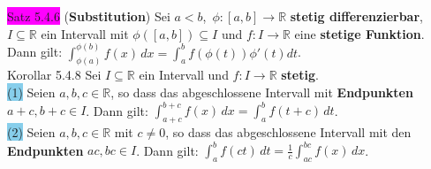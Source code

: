 \documentclass[landscape, 10pt]{article}
\newcommand{\R}{\mathbb{R}}
\begin{document}
\begin{multicols}{3}
              \colorbox{magenta}{Satz 5.4.6} 
              (\textbf{Substitution}) 
                     Sei \textcolor{NavyBlue}{$a<b$},\,
                     \textcolor{NavyBlue}{$\phi:[a,b]\longrightarrow\R$}
                     \textbf{stetig differenzierbar}, 
                     \textcolor{NavyBlue}{$I\subseteq\R$}
                     ein Intervall mit 
                     \textcolor{NavyBlue}{$\phi([a,b])\subseteq I$}
                     und \textcolor{NavyBlue}{$f:I\longrightarrow\R$} eine 
                     \textbf{stetige Funktion}. Dann gilt: 
                     \textcolor{NavyBlue}{$\int_{\phi(a)}^{\phi(b)}f(x)\,dx
                     =\int_a^bf(\phi(t))\phi'(t)dt$}.\\
              \colorbox{BurntOrange}{Korollar 5.4.8} 
                     Sei \textcolor{NavyBlue}{$I\subseteq\R$}
                     ein Intervall und \textcolor{NavyBlue}{$f:I\longrightarrow\R$} 
                     \textbf{stetig}. \\
                     \colorbox{SkyBlue}{(1)} Seien \textcolor{NavyBlue}{$a,b,c\in\R$}, 
                     so dass das abgeschlossene Intervall 
                     mit \textbf{Endpunkten} \textcolor{NavyBlue}{$a+c,b+c\in I$}. 
                     Dann gilt: 
                     \textcolor{NavyBlue}{
                     $\int_{a+c}^{b+c}f(x)\,dx=\int_a^bf(t+c)\,dt$}.\\
                     \colorbox{SkyBlue}{(2)} Seien \textcolor{NavyBlue}{$a,b,c\in\R$} mit 
                     \textcolor{NavyBlue}{$c\neq0$}, so dass das abgeschlossene Intervall mit den 
                     \textbf{Endpunkten} \textcolor{NavyBlue}{$ac,bc\in I$}. 
                     Dann gilt: \textcolor{NavyBlue}{
                     $\int_a^bf(ct)\,dt
                     =\frac{1}{c}\int_{ac}^{bc}f(x)\,dx$}.

\end{multicols}
\end{document}
